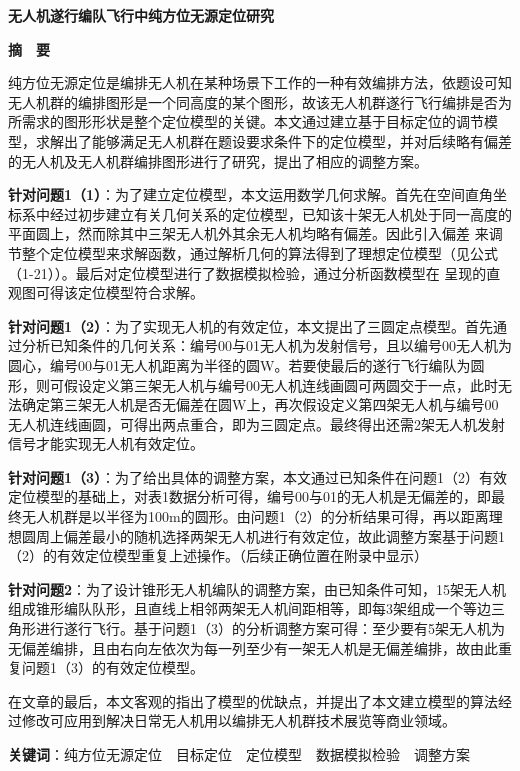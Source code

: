 \begin{center}
    \textbf{\fontsize{20}{1.5}无人机遂行编队飞行中纯方位无源定位研究}

    \textbf{摘　要}
\end{center}

纯方位无源定位是编排无人机在某种场景下工作的一种有效编排方法，依题设可知无人机群的编排图形是一个同高度的某个图形，故该无人机群遂行飞行编排是否为所需求的图形形状是整个定位模型的关键。本文通过建立基于目标定位的调节模型，求解出了能够满足无人机群在题设要求条件下的定位模型，并对后续略有偏差的无人机及无人机群编排图形进行了研究，提出了相应的调整方案。

\textbf{针对问题1（1）}：为了建立定位模型，本文运用数学几何求解。首先在空间直角坐标系中经过初步建立有关几何关系的定位模型，已知该十架无人机处于同一高度的平面圆上，然而除其中三架无人机外其余无人机均略有偏差。因此引入偏差 来调节整个定位模型来求解函数，通过解析几何的算法得到了理想定位模型（见公式（1-21））。最后对定位模型进行了数据模拟检验，通过分析函数模型在 呈现的直观图可得该定位模型符合求解。

\textbf{针对问题1（2）}：为了实现无人机的有效定位，本文提出了三圆定点模型。首先通过分析已知条件的几何关系：编号00与01无人机为发射信号，且以编号00无人机为圆心，编号00与01无人机距离为半径的圆W。若要使最后的遂行飞行编队为圆形，则可假设定义第三架无人机与编号00无人机连线画圆可两圆交于一点，此时无法确定第三架无人机是否无偏差在圆W上，再次假设定义第四架无人机与编号00无人机连线画圆，可得出两点重合，即为三圆定点。最终得出还需2架无人机发射信号才能实现无人机有效定位。

\textbf{针对问题1（3）}：为了给出具体的调整方案，本文通过已知条件在问题1（2）有效定位模型的基础上，对表1数据分析可得，编号00与01的无人机是无偏差的，即最终无人机群是以半径为100m的圆形。由问题1（2）的分析结果可得，再以距离理想圆周上偏差最小的随机选择两架无人机进行有效定位，故此调整方案基于问题1（2）的有效定位模型重复上述操作。（后续正确位置在附录中显示）

\textbf{针对问题2}：为了设计锥形无人机编队的调整方案，由已知条件可知，15架无人机组成锥形编队队形，且直线上相邻两架无人机间距相等，即每3架组成一个等边三角形进行遂行飞行。基于问题1（3）的分析调整方案可得：至少要有5架无人机为无偏差编排，且由右向左依次为每一列至少有一架无人机是无偏差编排，故由此重复问题1（3）的有效定位模型。

在文章的最后，本文客观的指出了模型的优缺点，并提出了本文建立模型的算法经过修改可应用到解决日常无人机用以编排无人机群技术展览等商业领域。

\textbf{关键词}：纯方位无源定位　目标定位　定位模型　数据模拟检验　调整方案
